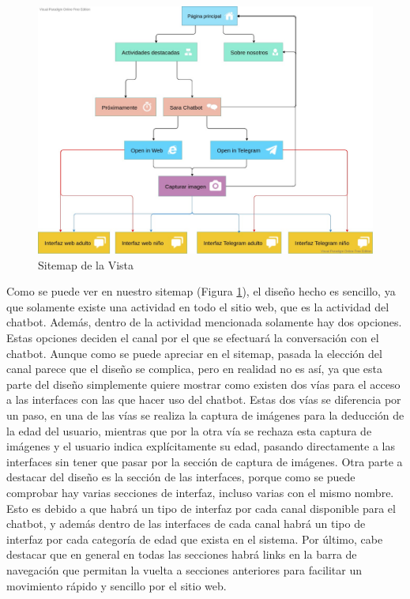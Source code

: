 \begin{figure}[h]
\centering
\includegraphics[width=1.1\textwidth]{imagenes/06_Diseno/Sitemap.jpg}
\caption{Sitemap de la Vista}
\label{fig:sitemap}
\end{figure}

Como se puede ver en nuestro sitemap (Figura \ref{fig:sitemap}), el diseño hecho es sencillo, ya que solamente existe una actividad en todo el sitio web, que es la actividad del chatbot. Además, dentro de la actividad mencionada solamente hay dos opciones. Estas opciones deciden el canal por el que se efectuará la conversación con el chatbot. Aunque como se puede apreciar en el sitemap, pasada la elección del canal parece que el diseño se complica, pero en realidad no es así, ya que esta parte del diseño simplemente quiere mostrar como existen dos vías para el acceso a las interfaces con las que hacer uso del chatbot. Estas dos vías se diferencia por un paso, en una de las vías se realiza la captura de imágenes para la deducción de la edad del usuario, mientras que por la otra vía se rechaza esta captura de imágenes y el usuario indica explícitamente su edad, pasando directamente a las interfaces sin tener que pasar por la sección de captura de imágenes. Otra parte a destacar del diseño es la sección de las interfaces, porque como se puede comprobar hay varias secciones de interfaz, incluso varias con el mismo nombre. Esto es debido a que habrá un tipo de interfaz por cada canal disponible para el chatbot, y además dentro de las interfaces de cada canal habrá un tipo de interfaz por cada categoría de edad que exista en el sistema. Por último, cabe destacar que en general en todas las secciones habrá \glspl{link} en la barra de navegación que permitan la vuelta a secciones anteriores para facilitar un movimiento rápido y sencillo por el sitio web.

